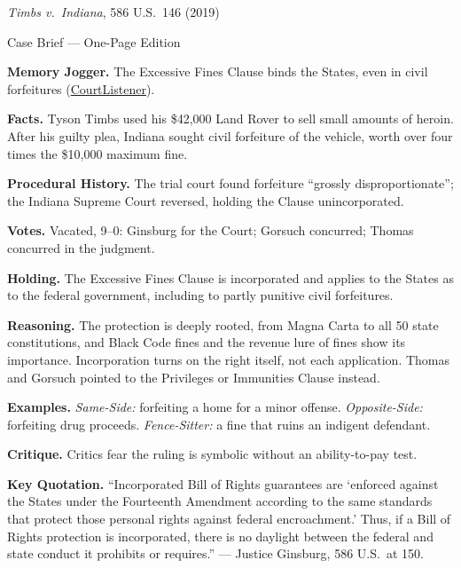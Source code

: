\documentclass[12pt]{article}
\begin{document}
\begin{center}
{\Large \textit{Timbs v.\ Indiana}, 586 U.S.\ 146 (2019)\par}
\vspace{0.3em}
{\normalsize Case Brief --- One-Page Edition\par}
\end{center}

\textbf{Memory Jogger.} The Excessive Fines Clause binds the States, even in civil forfeitures (\href{https://www.courtlistener.com/opinion/4591916/timbs-v-indiana/}{CourtListener}).

\textbf{Facts.} Tyson Timbs used his \$42,000 Land Rover to sell small amounts of heroin. After his guilty plea, Indiana sought civil forfeiture of the vehicle, worth over four times the \$10,000 maximum fine.

\textbf{Procedural History.} The trial court found forfeiture ``grossly disproportionate''; the Indiana Supreme Court reversed, holding the Clause unincorporated.

\textbf{Votes.} Vacated, 9--0: Ginsburg for the Court; Gorsuch concurred; Thomas concurred in the judgment.

\textbf{Holding.} The Excessive Fines Clause is incorporated and applies to the States as to the federal government, including to partly punitive civil forfeitures.

\textbf{Reasoning.} The protection is deeply rooted, from Magna Carta to all 50 state constitutions, and Black Code fines and the revenue lure of fines show its importance. Incorporation turns on the right itself, not each application. Thomas and Gorsuch pointed to the Privileges or Immunities Clause instead.

\textbf{Examples.} \emph{Same-Side:} forfeiting a home for a minor offense. \emph{Opposite-Side:} forfeiting drug proceeds. \emph{Fence-Sitter:} a fine that ruins an indigent defendant.

\textbf{Critique.} Critics fear the ruling is symbolic without an ability-to-pay test.

\textbf{Key Quotation.} ``Incorporated Bill of Rights guarantees are `enforced against the States under the Fourteenth Amendment according to the same standards that protect those personal rights against federal encroachment.' Thus, if a Bill of Rights protection is incorporated, there is no daylight between the federal and state conduct it prohibits or requires.'' --- Justice Ginsburg, 586 U.S.\ at 150.
\end{document}
